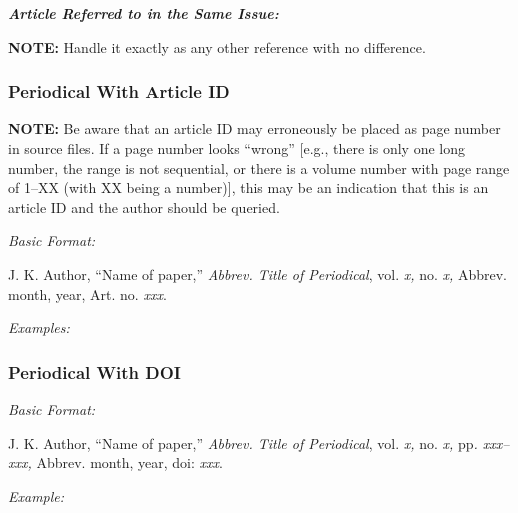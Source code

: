 \documentclass[10pt]{article}
\newcommand*{\guidelabel}[1]{\par\vspace{-4pt}\hspace*{22pt}\textit{#1}\par\vspace{-\parskip}}
\begin{document}
\textbf{\textit{Article Referred to in the Same Issue:}}

\begin{guideitems}
  \item {}
\end{guideitems}

\textbf{NOTE:} Handle it exactly as any other reference with no difference.

\subsubsection{Periodical With Article ID}

\textbf{NOTE:} Be aware that an article ID may erroneously be placed as page number in source files. If a page number looks “wrong” [e.g., there is only one long number, the range is not sequential, or there is a volume number with page range of 1–XX (with XX being a number)], this may be an indication that this is an article ID and the author should be queried.

\guidelabel{Basic Format:}
\begin{guideitems}
  \item J. K. Author, “Name of paper,” \textit{Abbrev. Title of Periodical}, vol. \textit{x,} no. \textit{x,} Abbrev. month, year, Art. no. \textit{xxx}.
\end{guideitems}
\guidelabel{Examples:}
\begin{guideitems}
  \item {}
  \item {}
  \item {}
  \item {}
  \item {}
\end{guideitems}

\subsubsection{Periodical With DOI}
\guidelabel{Basic Format:}
\begin{guideitems}
  \item J. K. Author, “Name of paper,” \textit{Abbrev. Title of Periodical}, vol. \textit{x,} no. \textit{x,} pp\textit{. xxx–xxx,} Abbrev. month, year, doi: \textit{xxx}.
\end{guideitems}
\guidelabel{Example:}
\begin{guideitems}
  \item {}
\end{guideitems}
\end{document}
